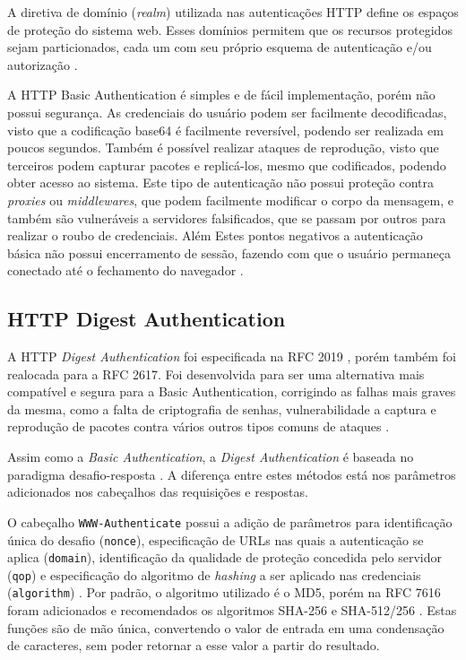 \documentclass[12pt]{article}
\begin{document}
A diretiva de domínio (\emph{realm}) utilizada nas autenticações HTTP define os espaços de proteção do sistema web. Esses domínios permitem que os recursos protegidos sejam particionados, cada um com 
seu próprio esquema de autenticação e/ou autorização \cite{RFC2617}.

A HTTP Basic Authentication é simples e de fácil implementação, porém não possui segurança. As 
credenciais do usuário podem ser facilmente decodificadas, visto que a codificação base64 é 
facilmente reversível, podendo ser realizada em poucos segundos. Também é possível realizar ataques 
de reprodução, visto que terceiros podem capturar pacotes e replicá-los, mesmo que codificados, 
podendo obter acesso ao sistema. Este tipo de autenticação não possui proteção contra \emph{proxies} 
ou \emph{middlewares}, que podem facilmente modificar o corpo da mensagem, e também são vulneráveis 
a servidores falsificados, que se passam por outros para realizar o roubo de credenciais. Além Estes 
pontos negativos a autenticação básica não possui encerramento de sessão, fazendo com que o usuário 
permaneça conectado até o fechamento do navegador \cite{GOURLEY2002}.

\subsection{HTTP Digest Authentication}

A HTTP \emph{Digest Authentication} foi especificada na RFC 2019 \cite{RFC2019}, porém também foi realocada para a RFC 2617. Foi desenvolvida para ser uma alternativa mais compatível e segura  para a Basic Authentication, corrigindo as falhas mais graves da mesma, como a falta de criptografia de senhas, vulnerabilidade a captura e reprodução de pacotes contra vários outros tipos comuns de ataques \cite{GOURLEY2002}.

Assim como a \emph{Basic Authentication}, a \emph{Digest Authentication} é baseada no paradigma 
desafio-resposta \cite{RFC7616}. A diferença entre estes métodos está nos parâmetros adicionados nos 
cabeçalhos das requisições e respostas. 

O cabeçalho \texttt{WWW-Authenticate} possui a adição de parâmetros para identificação única do 
desafio (\texttt{nonce}), especificação de URLs nas quais a autenticação se aplica (\texttt{domain}), identificação da qualidade de proteção concedida pelo servidor (\texttt{qop}) e especificação do algoritmo de \emph{hashing} a ser aplicado nas credenciais (\texttt{algorithm}) \cite{CHAPMAN2012}. Por padrão, o algoritmo utilizado é o MD5, porém na RFC 7616 foram adicionados e recomendados os algoritmos SHA-256 e SHA-512/256 \cite{RFC7616}. Estas funções são de mão única, convertendo o valor de entrada em uma condensação de caracteres, sem poder retornar a esse valor a partir do resultado.
\end{document}
